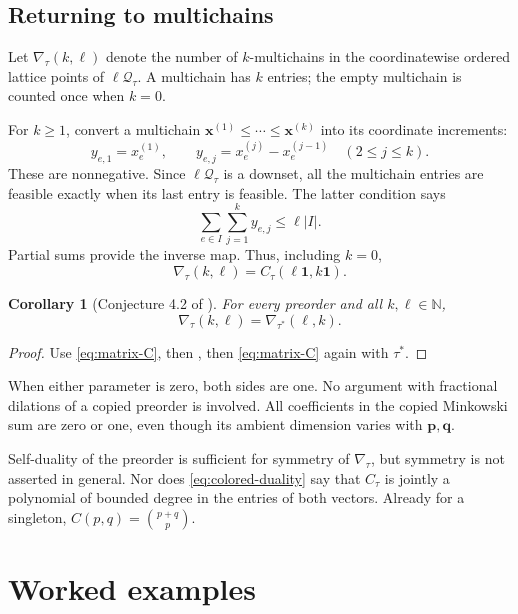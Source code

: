 \documentclass[11pt,letterpaper]{article}
\newtheorem{corollary}[corollary]{Corollary}
\theoremstyle{definition}
\newcommand{\N}{\mathbb N}
\newcommand{\one}{\mathbf 1}
\newcommand{\pvec}{\mathbf p}
\newcommand{\qvec}{\mathbf q}
\newcommand{\xvec}{\mathbf x}
\newcommand{\QQ}{\mathcal Q}
\newcommand{\card}[1]{\lvert #1\rvert}
\begin{document}
\subsection{Returning to multichains}
Let $\nabla_\tau(k,\ell)$ denote the number of $k$-multichains in the
coordinatewise ordered lattice points of $\ell\QQ_\tau$. A multichain
has $k$ entries; the empty multichain is counted once when $k=0$.

For $k\geq1$, convert a multichain
$\xvec^{(1)}\leq\cdots\leq\xvec^{(k)}$ into its coordinate increments:
\[
 y_{e,1}=x_e^{(1)},\qquad
 y_{e,j}=x_e^{(j)}-x_e^{(j-1)}\quad(2\leq j\leq k).
\]
These are nonnegative. Since $\ell\QQ_\tau$ is a downset, all the
multichain entries are feasible exactly when its last entry is feasible.
The latter condition says
\[
 \sum_{e\in I}\sum_{j=1}^k y_{e,j}\leq\ell\card I.
\]
Partial sums provide the inverse map. Thus, including $k=0$,
\begin{equation}\label{eq:matrix-C}
 \nabla_\tau(k,\ell)=C_\tau(\ell\one,k\one).
\end{equation}

\begin{corollary}[Conjecture 4.2 of \cite{AC26}]\label{cor:matrix}
For every preorder and all $k,\ell\in\N$,
\begin{equation}\label{eq:matrix-duality}
 \boxed{\nabla_\tau(k,\ell)=\nabla_{\tau^*}(\ell,k).}
\end{equation}
\end{corollary}
\begin{proof}
Use \eqref{eq:matrix-C}, then , then
\eqref{eq:matrix-C} again with $\tau^*$.
\end{proof}

When either parameter is zero, both sides are one. No argument with
fractional dilations of a copied preorder is involved. All coefficients
in the copied Minkowski sum are zero or one, even though its ambient
dimension varies with $\pvec,\qvec$.

Self-duality of the preorder is sufficient for symmetry of $\nabla_\tau$,
but symmetry is not asserted in general. Nor does
\eqref{eq:colored-duality} say that $C_\tau$ is jointly a polynomial of
bounded degree in the entries of both vectors. Already for a singleton,
$C(p,q)=\binom{p+q}{p}$.

\section{Worked examples}\label{sec:examples}
\end{document}
